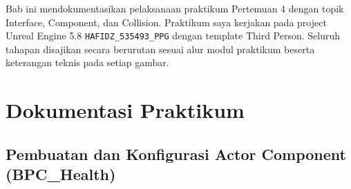 \documentclass[a4paper,oneside,12pt]{report}
\begin{document}
Bab ini mendokumentasikan pelaksanaan praktikum Pertemuan 4 dengan topik Interface, Component, dan Collision. Praktikum saya kerjakan pada project Unreal Engine 5.8 \texttt{HAFIDZ\_535493\_PPG} dengan template Third Person. Seluruh tahapan disajikan secara berurutan sesuai alur modul praktikum beserta keterangan teknis pada setiap gambar.

\section{Dokumentasi Praktikum}

\subsection{Pembuatan dan Konfigurasi Actor Component (BPC\_Health)}
\end{document}
